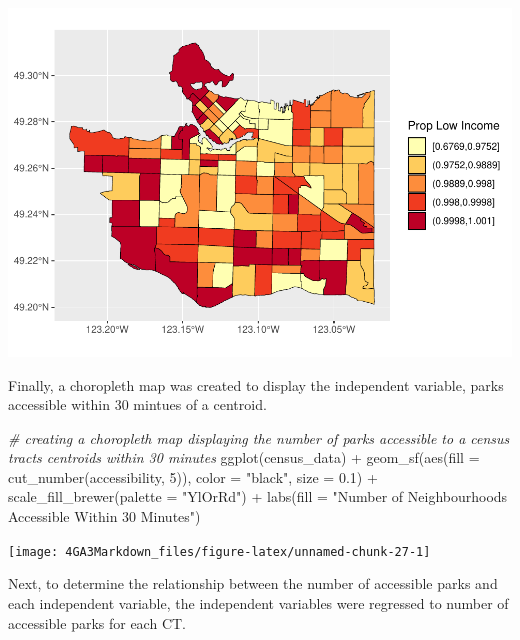 \documentclass[
]{article}
\newenvironment{Shaded}{\begin{snugshade}}{\end{snugshade}}
\newcommand{\AttributeTok}[1]{\textcolor[rgb]{0.77,0.63,0.00}{#1}}
\newcommand{\CommentTok}[1]{\textcolor[rgb]{0.56,0.35,0.01}{\textit{#1}}}
\newcommand{\DecValTok}[1]{\textcolor[rgb]{0.00,0.00,0.81}{#1}}
\newcommand{\FloatTok}[1]{\textcolor[rgb]{0.00,0.00,0.81}{#1}}
\newcommand{\FunctionTok}[1]{\textcolor[rgb]{0.00,0.00,0.00}{#1}}
\newcommand{\NormalTok}[1]{#1}
\newcommand{\SpecialCharTok}[1]{\textcolor[rgb]{0.00,0.00,0.00}{#1}}
\newcommand{\StringTok}[1]{\textcolor[rgb]{0.31,0.60,0.02}{#1}}
\begin{document}
\begin{center}\includegraphics[width=0.8\linewidth]{4GA3Markdown_files/figure-latex/unnamed-chunk-26-1} \end{center}

Finally, a choropleth map was created to display the independent
variable, parks accessible within 30 mintues of a centroid.

\begin{Shaded}
\begin{Highlighting}[]
\CommentTok{\# creating a choropleth map displaying the number of parks accessible to a census tract\textquotesingle{}s centroids within 30 minutes}
\FunctionTok{ggplot}\NormalTok{(census\_data) }\SpecialCharTok{+}
\FunctionTok{geom\_sf}\NormalTok{(}\FunctionTok{aes}\NormalTok{(}\AttributeTok{fill =} \FunctionTok{cut\_number}\NormalTok{(accessibility, }\DecValTok{5}\NormalTok{)),}
        \AttributeTok{color =} \StringTok{"black"}\NormalTok{,}
        \AttributeTok{size =} \FloatTok{0.1}\NormalTok{) }\SpecialCharTok{+}
\FunctionTok{scale\_fill\_brewer}\NormalTok{(}\AttributeTok{palette =} \StringTok{"YlOrRd"}\NormalTok{) }\SpecialCharTok{+}
\FunctionTok{labs}\NormalTok{(}\AttributeTok{fill =} \StringTok{"Number of Neighbourhoods Accessible Within 30 Minutes"}\NormalTok{)}
\end{Highlighting}
\end{Shaded}

\begin{center}\texttt{[image: 4GA3Markdown\_files/figure-latex/unnamed-chunk-27-1]} \end{center}

Next, to determine the relationship between the number of accessible
parks and each independent variable, the independent variables were
regressed to number of accessible parks for each CT.
\end{document}
